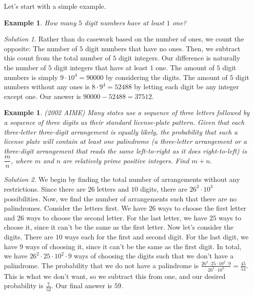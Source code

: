 \documentclass[letterpaper]{article}
\newtheorem{example}[thm]{Example}
\theoremstyle{remark}
\newtheorem*{solution}{Solution}
\theoremstyle{definition}
\begin{document}
Let's start with a simple example.

\begin{example}
How many $5$ digit numbers have at least $1$ one?
\end{example}

\begin{solution}
Rather than do casework based on the number of ones, we count the opposite: The number of $5$ digit numbers that have no ones. Then, we subtract this count from the total number of $5$ digit integers. Our difference is naturally the number of $5$ digit integers that have at least $1$ one. The amount of $5$ digit numbers is simply $9\cdot 10^4=90000$ by considering the digits. The amount of $5$ digit numbers without any ones is $8\cdot 9^4=52488$ by letting each digit be any integer except one. Our answer is $90000-52488=37512$.
\end{solution}

\bigskip

\begin{example}
(2002 AIME) Many states use a sequence of three letters followed by a sequence of three digits as their standard license-plate pattern. Given that each three-letter three-digit arrangement is equally likely, the probability that such a license plate will contain at least one palindrome (a three-letter arrangement or a three-digit arrangement that reads the same left-to-right as it does right-to-left) is $\dfrac{m}{n}$, where $m$ and $n$ are relatively prime positive integers. Find $m+n.$
\end{example}

\begin{solution}
We begin by finding the total number of arrangements without any restrictions. Since there are $26$ letters and $10$ digits, there are $26^3\cdot 10^3$ possibilities. Now, we find the number of arrangements such that there are no palindromes. Consider the letters first. We have $26$ ways to choose the first letter and $26$ ways to choose the second letter. For the last letter, we have $25$ ways to choose it, since it can't be the same as the first letter. Now let's consider the digits. There are $10$ ways each for the first and second digit. For the last digit, we have $9$ ways of choosing it, since it can't be the same as the first digit. In total, we have $26^2\cdot 25 \cdot 10^2 \cdot 9$ ways of choosing the digits such that we don't have a palindrome. The probability that we do not have a palindrome is $\frac{26^2\cdot 25\cdot 10^2 \cdot 9}{26^3\cdot 10^3}=\frac{45}{52}$. This is what we don't want, so we subtract this from one, and our desired probability is $\frac{7}{52}$. Our final answer is $59$.
\end{solution}
\end{document}
